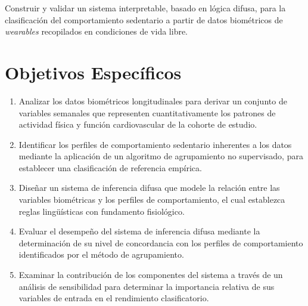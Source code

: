 Construir y validar un sistema interpretable, basado en lógica difusa, para la clasificación del comportamiento sedentario a partir de datos biométricos de \textit{wearables} recopilados en condiciones de vida libre.

\section{Objetivos Específicos}
\label{sec:objetivos_especificos}

\begin{enumerate}
    \item Analizar los datos biométricos longitudinales para derivar un conjunto de variables semanales que representen cuantitativamente los patrones de actividad física y función cardiovascular de la cohorte de estudio.
    
    \item Identificar los perfiles de comportamiento sedentario inherentes a los datos mediante la aplicación de un algoritmo de agrupamiento no supervisado, para establecer una clasificación de referencia empírica.
    
    \item Diseñar un sistema de inferencia difusa que modele la relación entre las variables biométricas y los perfiles de comportamiento, el cual establezca reglas lingüísticas con fundamento fisiológico.
    
    \item Evaluar el desempeño del sistema de inferencia difusa mediante la determinación de su nivel de concordancia con los perfiles de comportamiento identificados por el método de agrupamiento.
    
    \item Examinar la contribución de los componentes del sistema a través de un análisis de sensibilidad para determinar la importancia relativa de sus variables de entrada en el rendimiento clasificatorio.
\end{enumerate}
